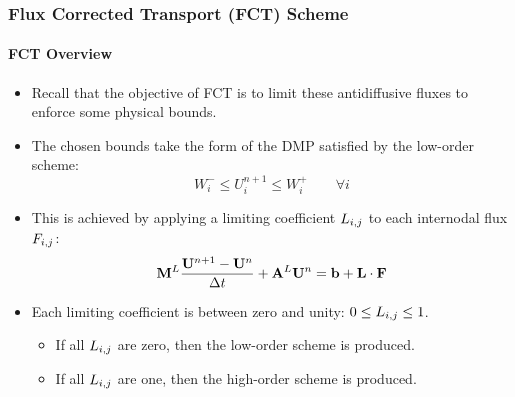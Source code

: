 \documentclass{beamer}
\begin{document}
\begin{frame}
\frametitle{Flux Corrected Transport (FCT) Scheme}
\framesubtitle{FCT Overview}

\begin{itemize}
   \item Recall that the objective of FCT is to limit these antidiffusive
      fluxes to enforce some physical bounds.
   \item The chosen bounds take the form of the DMP satisfied by the
      low-order scheme:
      \begin{equation}
         W_i^-\leq
         U_i^{n+1}\leq
         W_i^+\qquad\forall i
      \end{equation}
   \item This is achieved by applying a limiting coefficient $L_{i,j}$ to each
      internodal flux $F_{i,j}$:
      \begin{equation}
         \mathbf{M}^L\frac{\mathbf{U}^{n+1}-\mathbf{U}^n}{\Delta t} + \mathbf{A}^L\mathbf{U}^n = \mathbf{b} + \mathbf{L}\cdot\mathbf{F}
      \end{equation}
   \item Each limiting coefficient is between zero and unity: $0\leq L_{i,j}\leq 1$.
   \begin{itemize}
      \item If all $L_{i,j}$ are zero, then the low-order scheme is produced.
      \item If all $L_{i,j}$ are one, then the high-order scheme is produced.
   \end{itemize}
\end{itemize}

\end{frame}
\end{document}
